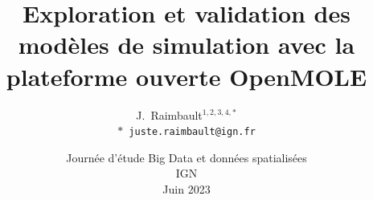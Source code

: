 \documentclass[english,11pt]{beamer}
\begin{document}
\title{Exploration et validation des modèles de simulation avec la plateforme ouverte OpenMOLE}

\author{J.~Raimbault$^{1,2,3,4,\ast}$\\
\texttt{$\ast$ juste.raimbault@ign.fr}
}




\date{Journée d'étude Big Data et données spatialisées\\\smallskip
IGN\\ Juin 2023
}

\frame{\maketitle}
\end{document}
